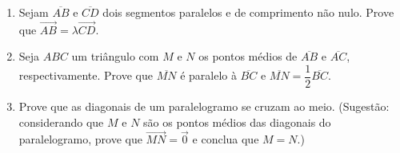 \documentclass[12pt,a4paper]{article}
\begin{document}
\begin{enumerate}
  \item Sejam $\overline{AB}$ e $\overline{CD}$ dois segmentos paralelos e de
  comprimento não nulo. Prove que $\overrightarrow{AB} = \lambda\overrightarrow{CD}$.
    
  \item Seja $ABC$ um triângulo com $M$ e $N$ os pontos médios de $\overline{AB}$ e
    $\overline{AC}$, respectivamente. Prove que $\overline{MN}$ é paralelo à
    $\overline{BC}$ e $\overline{MN} = \dfrac{1}{2}\overline{BC}$.
 
  \item Prove que as diagonais de um paralelogramo se cruzam ao meio. (Sugestão:
    considerando que $M$ e $N$ são os pontos médios das diagonais do paralelogramo, 
    prove que $\overrightarrow{MN} = \vec{0}$ e conclua que $M = N$.)
  
\end{enumerate}
\end{document}
